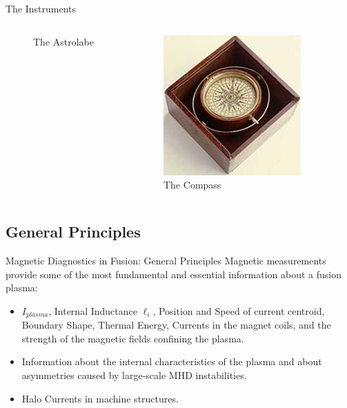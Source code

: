 \documentclass{beamer}
\begin{document}
\begin{frame}{The Instruments}
\begin{columns}
\begin{figure}[ht]
\begin{center}
	\caption{\tiny The Astrolabe}
	\end{center}
	\end{figure}
   {
 	\begin{figure}[ht]
	\begin{center}
	\includegraphics[width=0.9 \columnwidth]{Compass.jpg}
	\caption{\tiny The Compass}
	\end{center}
	\end{figure}
}
\end{columns}
\end{frame}

\subsection{General Principles}

\begin{frame}{ Magnetic Diagnostics in Fusion: General Principles}%
    Magnetic measurements provide some of the most   \alert{fundamental} and %
\alert{essential} information about a fusion plasma:

  \begin{itemize}
  \item<2->
    $I_{plasma}$, Internal Inductance $\ell_i$,   Position and Speed of current centroid,
	Boundary Shape, Thermal Energy, Currents in the magnet coils,
	and the strength of the magnetic fields confining the plasma.
%
  \item<3->
    Information about the internal characteristics of the plasma and
	about asymmetries caused by large-scale MHD instabilities.
  \item<4-> Halo Currents in machine structures.
  \end{itemize}
\end{frame}
\end{document}

